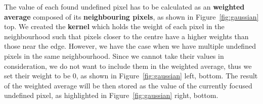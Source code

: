 \documentclass[12pt, a4paper]{report}
\begin{document}
	\par The value of each found undefined pixel has to be calculated as an \textbf{weighted average} composed of its \textbf{neighbouring pixels}, as shown in Figure~\ref{fig:gaussian} top. We created the \textbf{kernel} which holds the weight of each pixel in the neighbourhood such that pixels closer to the centre have a higher weights than those near the edge. However, we have the case when we have multiple undefined pixels in the same neighbourhood. Since we cannot take their values in consideration, we do not want to include them in the weighted average, thus we set their weight to be 0, as shown in Figure~\ref{fig:gaussian} left, bottom. The result of the weighted average will be then stored as the value of the currently focused undefined pixel, as highlighted in Figure~\ref{fig:gaussian} right, bottom.
	
\end{document}
